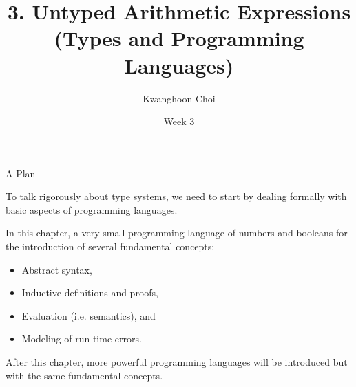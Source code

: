 \documentclass[table]{beamer}
\title[Types and Programming Languages]{3. Untyped Arithmetic Expressions \\
(Types and Programming Languages)}
\author[K. Choi]{Kwanghoon Choi}
\institute[Chonnam National University]{
Software Languages and Systems Laboratory \\
	Chonnam National University}
\date{Week 3}
\begin{document}
\begin{frame}
	\titlepage
	
\end{frame}


\begin{frame}[t]{A Plan} \vspace{10pt}

To talk rigorously about type systems, we need to start by dealing formally with basic aspects of programming languages.

\vspace{10pt}

In this chapter, a very small programming language of numbers and booleans for the introduction of several fundamental concepts:
\begin{itemize}
\item Abstract syntax,
\item Inductive definitions and proofs,
\item Evaluation (i.e. semantics), and 
\item Modeling of run-time errors.
\end{itemize}

\vspace{10pt}

After this chapter, more powerful programming languages will be introduced but with the same fundamental concepts. 

\end{frame}
\end{document}
